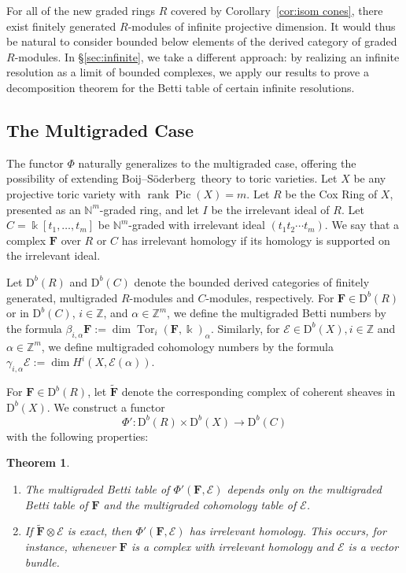 \documentclass[12pt]{amsart}
\newtheorem{theorem}[lemma]{Theorem}
\theoremstyle{definition}
\theoremstyle{remark}
\newcommand{\Pic}{\operatorname{Pic}}
\newcommand{\Tor}{\operatorname{Tor}}
\newcommand{\kk}{\Bbbk}
\newcommand{\rank}{\operatorname{rank}}
\newcommand{\ZZ}{\mathbb{Z}}
\newcommand{\cE}{\mathcal{E}}
\newcommand{\FF}{\mathbf{F}}
\newcommand{\defi}[1]{\textsf{#1}} %
\newcommand{\DD}{\mathrm{D}}
\def\BS{Boij--S\"oderberg~}
\begin{document}
For all of the new graded rings $R$ covered by Corollary~\ref{cor:isom cones}, there exist finitely generated $R$-modules of infinite projective dimension.  It would thus be natural to consider bounded below elements of the derived category of graded $R$-modules.  In \S\ref{sec:infinite}, we take a different approach: by realizing an infinite resolution as a limit of bounded complexes, we apply our results to prove a decomposition theorem for the Betti table of certain infinite resolutions.

\subsection*{The Multigraded Case}
The functor $\Phi$ naturally generalizes to the multigraded case, offering the possibility of extending \BS theory to toric varieties.  Let $X$ be any projective toric variety with $\rank \Pic(X)=m$.  Let $R$ be the Cox Ring of $X$, presented as an $\mathbb N^m$-graded ring, and let $I$ be the irrelevant ideal of $R$.  Let $C=\kk[t_1, \dots, t_m]$ be $\mathbb N^m$-graded with irrelevant ideal $(t_1t_2\cdots t_m)$.  We say that a complex $\FF$ over $R$ or $C$ has \defi{irrelevant homology} if its homology is supported on the irrelevant ideal.

Let $\DD^b(R)$ and $\DD^b(C)$ denote the bounded derived categories of finitely generated, multigraded $R$-modules and $C$-modules, respectively.   For $\FF\in \DD^b(R)$ or in $\DD^b(C)$, $i\in \ZZ$, and $\alpha\in \ZZ^m$, we define the multigraded Betti numbers by the formula $\beta_{i,\alpha} \FF:=\dim \Tor_i(\FF,\kk)_{\alpha}$.  Similarly, for $\cE\in \DD^b(X), i\in \ZZ$ and $\alpha\in \ZZ^m$, we define multigraded cohomology numbers by the formula $\gamma_{i,\alpha} \cE:=\dim H^i(X, \cE(\alpha))$.  


For  $\FF\in \DD^b(R)$, let $\widetilde{\FF}$ denote the corresponding complex of coherent sheaves in $\DD^b(X)$.  We construct a functor
\[
\Phi': \DD^b(R)\times \DD^b(X)\to \DD^b(C)
\]
with the following properties:
\begin{theorem}\label{thm:Phimulti}
\begin{enumerate}
	\item\label{thm:Phi':1}  The multigraded Betti table of $\Phi'(\FF,\cE)$ depends only on the multigraded Betti table of $\FF$ and the multigraded cohomology table of $\cE$.
	\item\label{thm:Phi':2}  If $\widetilde{\FF}\otimes \cE$ is exact, then $\Phi'(\FF,\cE)$ has irrelevant homology.  This occurs, for instance, whenever $\FF$ is a complex with irrelevant homology and $\cE$ is a vector bundle.
\end{enumerate}
\end{theorem}
\end{document}
